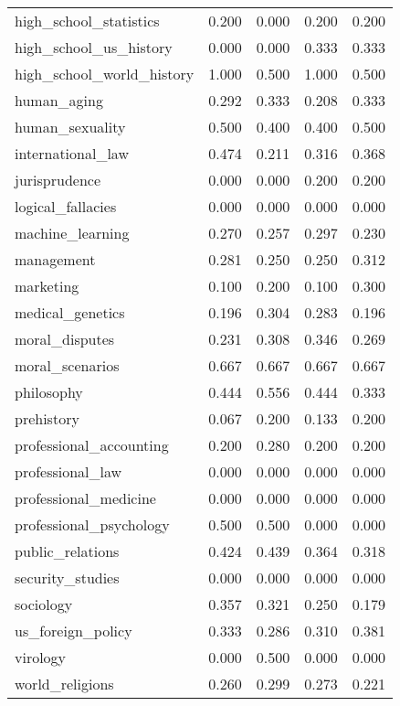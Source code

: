 \begin{tabular}{lrrrr}
high\_school\_statistics & 0.200 & 0.000 & 0.200 & 0.200 \\
high\_school\_us\_history & 0.000 & 0.000 & 0.333 & 0.333 \\
high\_school\_world\_history & 1.000 & 0.500 & 1.000 & 0.500 \\
human\_aging & 0.292 & 0.333 & 0.208 & 0.333 \\
human\_sexuality & 0.500 & 0.400 & 0.400 & 0.500 \\
international\_law & 0.474 & 0.211 & 0.316 & 0.368 \\
jurisprudence & 0.000 & 0.000 & 0.200 & 0.200 \\
logical\_fallacies & 0.000 & 0.000 & 0.000 & 0.000 \\
machine\_learning & 0.270 & 0.257 & 0.297 & 0.230 \\
management & 0.281 & 0.250 & 0.250 & 0.312 \\
marketing & 0.100 & 0.200 & 0.100 & 0.300 \\
medical\_genetics & 0.196 & 0.304 & 0.283 & 0.196 \\
moral\_disputes & 0.231 & 0.308 & 0.346 & 0.269 \\
moral\_scenarios & 0.667 & 0.667 & 0.667 & 0.667 \\
philosophy & 0.444 & 0.556 & 0.444 & 0.333 \\
prehistory & 0.067 & 0.200 & 0.133 & 0.200 \\
professional\_accounting & 0.200 & 0.280 & 0.200 & 0.200 \\
professional\_law & 0.000 & 0.000 & 0.000 & 0.000 \\
professional\_medicine & 0.000 & 0.000 & 0.000 & 0.000 \\
professional\_psychology & 0.500 & 0.500 & 0.000 & 0.000 \\
public\_relations & 0.424 & 0.439 & 0.364 & 0.318 \\
security\_studies & 0.000 & 0.000 & 0.000 & 0.000 \\
sociology & 0.357 & 0.321 & 0.250 & 0.179 \\
us\_foreign\_policy & 0.333 & 0.286 & 0.310 & 0.381 \\
virology & 0.000 & 0.500 & 0.000 & 0.000 \\
world\_religions & 0.260 & 0.299 & 0.273 & 0.221 \\
\bottomrule
\end{tabular}
